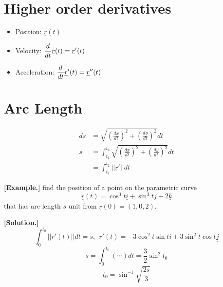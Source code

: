 \documentclass[11pt, a4paper]{MATH2023}
\newcommand{\eg}{\textbf{[Example.] }}
\newcommand{\sol}{\textbf{[Solution.] }}
\newcommand{\rr}{\underline{r}}
\newcommand{\ii}{\underline{i}}
\newcommand{\kk}{\underline{k}}
\newcommand{\jj}{\underline{j}}
\begin{document}
\begin{spacing}{1.3}
    \section{Higher order derivatives}
    \begin{itemize}
        \item Position: $\rr(t)$
        \item Velocity: $\disp \frac{d}{dt}\rr(t) = \rr'(t)$
        \item Acceleration: $\disp \frac{d}{dt}\rr'(t) = \rr''(t)$
    \end{itemize}


    \section{Arc Length}
    \begin{align*}
        ds &= \sqrt{\left(\frac{dx}{dt}\right)^2 + \left(\frac{dy}{dt}\right)^2} dt\\
        s &= \int_{t_1}^{t_2} \sqrt{\left(\frac{dx}{dt}\right)^2 + \left(\frac{dy}{dt}\right)^2} dt\\
        &= \int_{t_1}^{t_2} ||\rr'|| dt
    \end{align*}

    \eg find the position of a point on the parametric curve 
    $$\rr(t)=\cos^3t\ii+\sin^3t\jj+2\kk$$
    that has arc length $s$ unit from $\rr(0)=(1,0,2)$.

    \sol $$\int_{0}^{t_0}||\rr'(t)||dt=s,\ \ \rr'(t)=-3\cos^2t\sin t\ii+3\sin^2 t\cos t\jj$$
    $$s=\int_{0}^{t_0}(\cdots)dt=\frac{3}{2}\sin^2 t_0$$
    $$t_0=\sin^{-1}\sqrt{\frac{2s}{3}}$$
    

\end{spacing}
\end{document}
